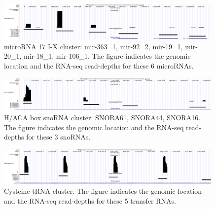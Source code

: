\documentclass[10pt]{bmc_article}
\newenvironment{bmcformat}{\begin{raggedright}\baselineskip20pt\sloppy\setboolean{publ}{false}}{\end{raggedright}\baselineskip20pt\sloppy}
\begin{document}
\begin{bmcformat}
\begin{figure}[ht]
\includegraphics[width=0.99\textwidth]{figures/mir-17-I-X-cluster.pdf}
  \caption[]{microRNA 17 I-X cluster: mir-363\_1, mir-92\_2,
    mir-19\_1, mir-20\_1, mir-18\_1, mir-106\_1. The figure indicates
    the genomic location and the RNA-seq read-depths for these 6
    microRNAs.}\label{fig:11}
\end{figure}

\begin{figure}[ht]
\includegraphics[width=0.99\textwidth]{figures/chr23-2507395-2508461-snoRNA-cluster.pdf}
  \caption[]{H/ACA box snoRNA cluster: SNORA61, SNORA44, SNORA16. The figure indicates
    the genomic location and the RNA-seq read-depths for these 3
    snoRNAs.}\label{fig:12}
\end{figure}

\begin{figure}[ht]
\includegraphics[width=0.99\textwidth]{figures/chr27-4040511-4042052-tRNA-cluster.pdf}
  \caption[]{Cysteine tRNA cluster. The figure indicates
    the genomic location and the RNA-seq read-depths for these 5
    transfer RNAs.}\label{fig:13}
\end{figure}


\end{bmcformat}
\end{document}
